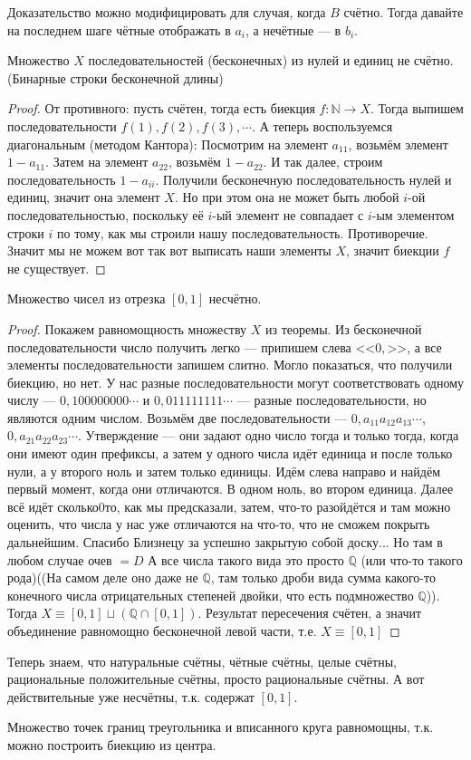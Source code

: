 \begin{remark}
Доказательство можно модифицировать для случая, когда $B$ счётно. Тогда давайте на последнем шаге чётные отображать в $a_i$, а нечётные --- в $b_i$. 
\end{remark}
\begin{theorem}
	Множество $X$ последовательностей (бесконечных) из нулей и единиц не счётно. (Бинарные строки бесконечной длины)
\end{theorem}
\begin{proof}
	От противного: пусть счётен, тогда есть биекция $f \colon \mathbb{N} \to X$. Тогда выпишем последовательности $f(1), f(2), f(3), \cdots$. 
	А теперь воспользуемся диагональным (методом Кантора): Посмотрим на элемент $a_{11}$, возьмём элемент $1 - a_{11}$. Затем на элемент $a_{22}$, возьмём $1 - a_{22}$. И так далее, строим последовательность $1 - a_{ii}$. Получили бесконечную последовательность нулей и единиц, значит она элемент $X$. Но при этом она не может быть любой $i$-ой последовательностью, поскольку её $i$-ый элемент не совпадает с $i$-ым элементом строки $i$ по тому, как мы строили нашу последовательность.
	Противоречие. Значит мы не можем вот так вот выписать наши элементы $X$, значит биекции $f$ не существует. 
\end{proof}
\begin{consequence}
	Множество чисел из отрезка $[0, 1]$ несчётно.
\end{consequence}
\begin{proof}
	Покажем равномощность множеству $X$ из теоремы. Из бесконечной последовательности число получить легко --- припишем слева <<$0,$>>, а все элементы последовательности запишем слитно. Могло показаться, что получили биекцию, но нет. У нас разные последовательности могут соответствовать одному числу --- $0,100000000\cdots$ и $0,011111111\cdots$  --- разные последовательности, но являются одним числом. 
	Возьмём две последовательности --- $0,a_{11}a_{12}a_{13}\cdots$, $0,a_{21}a_{22}a_{23}\cdots$. Утверждение --- они задают одно число тогда и только тогда, когда они имеют один префиксы, а затем у одного числа идёт единица и после только нули, а у второго ноль и затем только единицы.
	Идём слева направо и найдём первый момент, когда они отличаются. В одном ноль, во втором единица. Далее всё идёт сколько0то, как мы предсказали, затем, что-то разойдётся и там можно оценить, что числа у нас уже отличаются на что-то, что не сможем покрыть дальнейшим. Спасибо Близнецу за успешно закрытую собой доску... Но там в любом случае очев $=D$
	А все числа такого вида это просто $\mathbb{Q}$ (или что-то такого рода)((На самом деле оно даже не $\mathbb{Q}$, там только дроби вида сумма какого-то конечного числа отрицательных степеней двойки, что есть подмножество $\mathbb{Q}$)).
	Тогда $X \equiv [0, 1] \sqcup (\mathbb{Q} \cap [0, 1])$. Результат пересечения счётен, а значит объединение равномощно бесконечной левой части, т.е. $X \equiv [0, 1]$
\end{proof}
Теперь знаем, что натуральные счётны, чётные счётны, целые счётны, рациональные положительные счётны, просто рациональные счётны. А вот действительные уже несчётны, т.к. содержат $[0, 1]$.

\begin{example}
	Множество точек границ треугольника и вписанного круга равномощны, т.к. можно построить биекцию из центра. 
\end{example}
